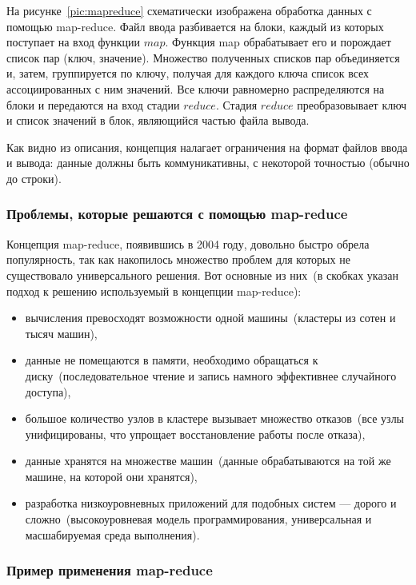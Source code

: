 \documentclass[12pt,a4paper,oneside]{extarticle}
\begin{document}
        На рисунке~\ref{pic:mapreduce} схематически изображена обработка данных с помощью map-reduce. Файл ввода разбивается на блоки, каждый из которых поступает на вход функции $map$. Функция map обрабатывает его и порождает список пар (ключ, значение). Множество полученных списков пар объединяется и, затем, группируется по ключу, получая для каждого ключа список всех ассоциированных с ним значений. Все ключи равномерно распределяются на блоки и передаются на вход стадии $reduce$. Стадия $reduce$ преобразовывает ключ и список значений в блок, являющийся частью файла вывода.

        Как видно из описания, концепция налагает ограничения на формат файлов ввода и вывода: данные должны быть коммуникативны, с некоторой точностью (обычно до строки).
    \clearpage

        \subsubsection{Проблемы, которые решаются с помощью map-reduce}
            Концепция map-reduce, появившись в 2004 году, довольно быстро обрела популярность, так как накопилось множество проблем для которых не существовало универсального решения. Вот основные из них~(в скобках указан подход к решению используемый в концепции map-reduce):

            \begin{itemize}
                \item вычисления превосходят возможности одной машины~(кластеры из сотен и тысяч машин),
                \item данные не помещаются в памяти, необходимо обращаться к диску~(последовательное чтение и запись намного эффективнее случайного доступа),
                \item большое количество узлов в кластере вызывает множество отказов~(все узлы унифицированы, что упрощает восстановление работы после отказа),
                \item данные хранятся на множестве машин~(данные обрабатываются на той же машине, на которой они хранятся),
                \item разработка низкоуровневных приложений для подобных систем --- дорого и сложно~(высокоуровневая модель программирования, универсальная и масшабируемая среда выполнения).
            \end{itemize} 

        \subsubsection{Пример применения map-reduce}
\end{document}
